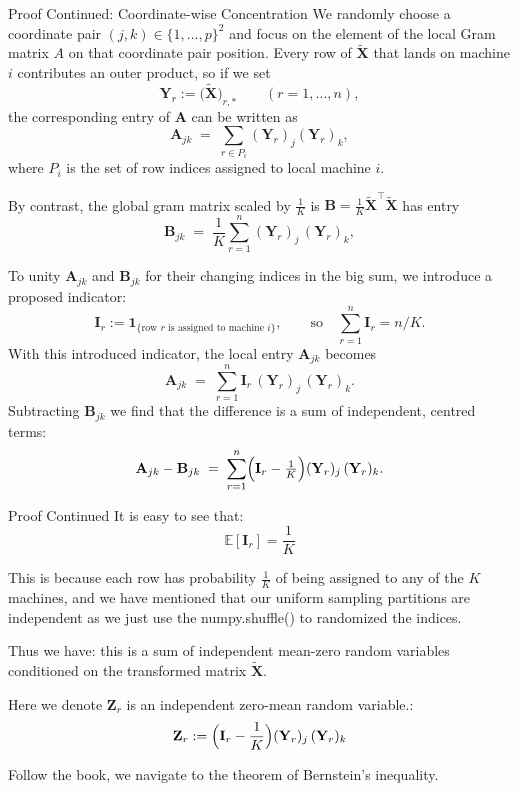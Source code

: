 \documentclass{beamer}
\theoremstyle{remark}
\begin{document}
\begin{frame}{Proof Continued: Coordinate-wise Concentration}
We randomly choose a coordinate pair \((j,k)\in\{1,\dots,p\}^{2}\) and focus on
the element of the local Gram matrix \(A\) on that coordinate pair position.
Every row of $\tilde{\mathbf{X}}$ that lands on machine $i$ contributes an
outer product, so if we set
\[
  \mathbf{Y}_{r}:=\bigl(\tilde{\mathbf{X}}\bigr)_{r,*}\qquad(r=1,\dots,n),
\]
the corresponding entry of $\mathbf{A}$ can be written as
\[
  \mathbf{A}_{jk} \;=\; \sum_{r\in P_i} (\mathbf{Y}_r)_j (\mathbf{Y}_r)_k,
\]
where \(P_i\) is the set of row indices assigned to local machine \(i\).
\end{frame}
\begin{frame}
By contrast, the global gram matrix scaled by $\tfrac1K$ is
\(\mathbf{B}=\tfrac1K \tilde{\mathbf{X}}^{\top}\tilde{\mathbf{X}}\) has entry
\[
  \mathbf{B}_{jk}\;=\;\frac1K\sum_{r=1}^{n}(\mathbf{Y}_{r})_{j}\,(\mathbf{Y}_{r})_{k},
\]

To unity $\mathbf{A}_{jk}$ and $\mathbf{B}_{jk}$ for their changing indices in the big sum, we introduce a proposed indicator:
\[
  \mathbf{I}_{r}:=\mathbf 1_{\bigl\{\text{row }r\text{ is assigned to machine }i\bigr\}},
  \qquad\text{so}\quad\sum_{r=1}^{n}\mathbf{I}_{r}=n/K.
\]
With this introduced indicator, the local entry $\mathbf{A}_{jk}$ becomes
\[
  \mathbf{A}_{jk}\;=\;\sum_{r=1}^{n}\mathbf{I}_{r}\,(\mathbf{Y}_{r})_{j}\,(\mathbf{Y}_{r})_{k}.
\]
Subtracting \(\mathbf{B}_{jk}\) we find that the difference is a sum of
independent, centred terms:
\[
  \mathbf{A}_{jk}-\mathbf{B}_{jk}
    \;=\;
    \sum_{r=1}^{n}\Bigl(\mathbf{I}_{r}-\tfrac1K\Bigr)
      (\mathbf{Y}_{r})_{j}\,(\mathbf{Y}_{r})_{k}.
\]
\end{frame}
\begin{frame}{Proof Continued}
It is easy to see that:
\[
\mathbb{E}[\mathbf{I}_r] = \frac{1}{K}
\]

This is because each row has probability \(\frac{1}{K}\) of being
assigned to any of the \(K\) machines, and we have mentioned that our uniform sampling partitions are independent as we just use the numpy.shuffle() to randomized the indices.

Thus we have: this is a sum of independent mean-zero random variables conditioned on the transformed matrix \(\tilde{\mathbf{X}}\).

Here we denote $\mathbf{Z}_r$ is an independent zero-mean random variable.:
  \[
  \mathbf{Z}_{r} := \Bigl(\mathbf{I}_{r}-\frac{1}{K}\Bigr)(\mathbf{Y}_{r})_{j}\,(\mathbf{Y}_{r})_{k}
  \]

Follow the book\cite{vershynin2018high}, we navigate to the theorem of Bernstein’s inequality.
\end{frame}
\end{document}
